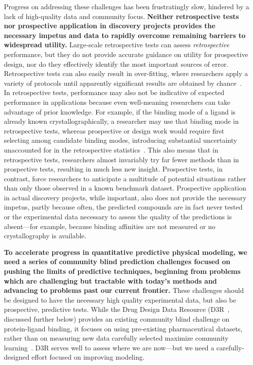 \documentclass[11pt]{article}
\begin{document}
Progress on addressing these challenges has been frustratingly slow, hindered by a lack of high-quality data and community focus.
{\bf Neither retrospective tests nor prospective application in discovery projects provides the necessary impetus and data to rapidly overcome remaining barriers to widespread utility.}
Large-scale retrospective tests can assess \emph{retrospective} performance, but they do not provide accurate guidance on utility for prospective design, nor do they effectively identify the most important sources of error.
Retrospective tests can also easily result in over-fitting, where researchers apply a variety of protocols until apparently significant results are obtained by chance~\cite{Nuzzo:2015:Nature}.
In retrospective tests, performance may also not be indicative of expected performance in applications because even well-meaning researchers can take advantage of prior knowledge. 
For example, if the binding mode of a ligand is already known crystallographically, a researcher may use that binding mode in retrospective tests, whereas prospective or design work would require first selecting among candidate binding modes, introducing substantial uncertainty unaccounted for in the retrospective statistics~\cite{mobley_predicting_2007, boyce_predicting_2009, mobley_perspective_2012}.
This also means that in retrospective tests, researchers almost invariably try far fewer methods than in prospective tests, resulting in much less new insight.
Prospective tests, in contrast, force researchers to anticipate a multitude of potential situations rather than only those observed in a known benchmark dataset.
Prospective application in actual discovery projects, while important, also does not provide the necessary impetus, partly because often, the predicted compounds are in fact never tested~\cite{christ_binding_2016} or the experimental data necessary to assess the quality of the predictions is absent---for example, because binding affinities are not measured or no crystallography is available. 

{\bf To accelerate progress in quantitative predictive physical modeling, we need a series of community blind prediction challenges focused on pushing the limits of predictive techniques, beginning from problems which are challenging but tractable with today's methods and advancing to problems past our current frontier.}
These challenges should be designed to have the necessary high quality experimental data, but also be prospective, predictive tests.
While the Drug Design Data Resource (D3R~\cite{gathiaka_d3r_2016}, discussed further below) provides an existing community blind challenge on protein-ligand binding, it focuses on using pre-existing pharmaceutical datasets, rather than on measuring new data carefully selected maximize community learning~\cite{gathiaka_d3r_2016}. 
D3R serves well to assess where we are now---but we need a carefully-designed effort focused on improving modeling.
\end{document}
